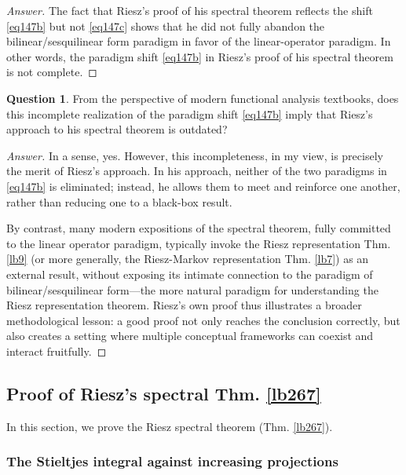 \documentclass[12pt,b5paper,notitlepage]{article}
\theoremstyle{definition}
\newtheorem{question}[df]{Question}
\theoremstyle{plain}
\numberwithin{equation}{section}
\begin{document}
\begin{proof}[Answer]
The fact that Riesz's proof of his spectral theorem reflects the shift \eqref{eq147b} but not \eqref{eq147c} shows that he did not fully abandon the bilinear/sesquilinear form paradigm in favor of the linear-operator paradigm. In other words, the paradigm shift \eqref{eq147b} in Riesz's proof of his spectral theorem is not complete.
\end{proof}


\begin{question}
From the perspective of modern functional analysis textbooks, does this incomplete realization of the paradigm shift \eqref{eq147b} imply that Riesz's approach to his spectral theorem is outdated?
\end{question}


\begin{proof}[Answer]
In a sense, yes. However, this incompleteness, in my view, is precisely the merit of Riesz's approach. In his approach, neither of the two paradigms in \eqref{eq147b} is eliminated; instead, he allows them to meet and reinforce one another, rather than reducing one to a black-box result.

By contrast, many modern expositions of the spectral theorem, fully committed to the linear operator paradigm, typically invoke the Riesz representation Thm. \ref{lb9} (or more generally, the Riesz-Markov representation Thm. \ref{lb7}) as an external result, without exposing its intimate connection to the paradigm of bilinear/sesquilinear form---the more natural paradigm for understanding the Riesz representation theorem. Riesz's own proof thus illustrates a broader methodological lesson: a good proof not only reaches the conclusion correctly, but also creates a setting where multiple conceptual frameworks can coexist and interact fruitfully.
\end{proof}


\subsection{Proof of Riesz's spectral Thm. \ref{lb267}}\label{lb278}


In this section, we prove the Riesz spectral theorem (Thm. \ref{lb267}).


\subsubsection{The Stieltjes integral against increasing projections}\label{lb288}
\end{document}
